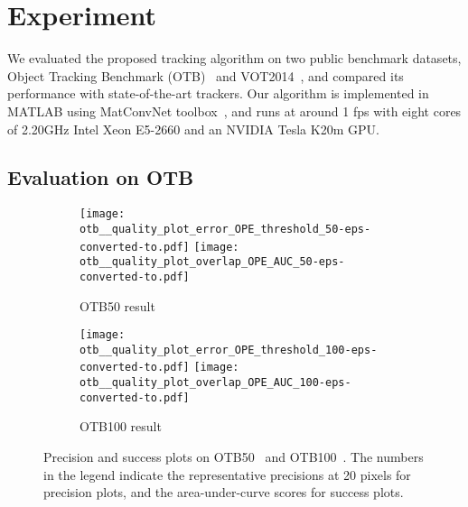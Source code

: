\documentclass[10pt,twocolumn,letterpaper]{article}
\begin{document}
\section{Experiment}
\label{sec:experiment}
We evaluated the proposed tracking algorithm on two public benchmark datasets, Object Tracking Benchmark (OTB)~\cite{otb2} and VOT2014~\cite{vot14}, and compared its performance with state-of-the-art trackers. 
Our algorithm is implemented in MATLAB using MatConvNet toolbox~\cite{vedaldi15matconvnet}, and runs at around 1 fps with eight cores of 2.20GHz Intel Xeon E5-2660 and an NVIDIA Tesla K20m GPU.

\subsection{Evaluation on OTB}

\begin{figure}[t]
\begin{center}
\begin{subfigure}[b]{\linewidth}
\texttt{[image: otb\_\_quality\_plot\_error\_OPE\_threshold\_50-eps-converted-to.pdf]}
\texttt{[image: otb\_\_quality\_plot\_overlap\_OPE\_AUC\_50-eps-converted-to.pdf]}
\vspace{-5mm}
\caption{OTB50 result}
\label{fig:otb50}
\end{subfigure}
\begin{subfigure}[b]{\linewidth}
\texttt{[image: otb\_\_quality\_plot\_error\_OPE\_threshold\_100-eps-converted-to.pdf]}
\texttt{[image: otb\_\_quality\_plot\_overlap\_OPE\_AUC\_100-eps-converted-to.pdf]}
\vspace{-5mm}
\caption{OTB100 result}
\label{fig:otb100}
\end{subfigure}
\end{center}
\vspace{-5mm}
\caption{Precision and success plots on OTB50~\cite{otb1} and OTB100~\cite{otb2}. The numbers in the legend indicate the representative precisions at 20 pixels for precision plots, and the area-under-curve scores for success plots. }
\label{fig:otb_result}
\end{figure}
\end{document}
